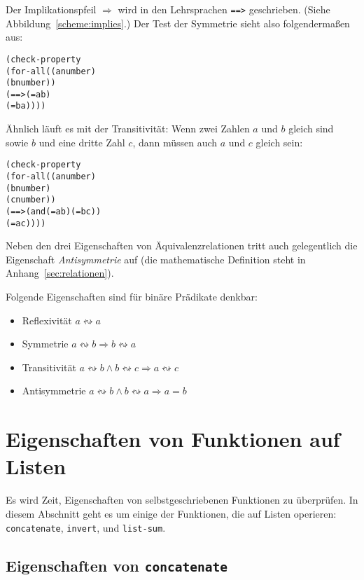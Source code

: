 Der Implikationspfeil $\Rightarrow$ wird in den Lehrsprachen
\texttt{==>} geschrieben.  (Siehe
Abbildung~\ref{scheme:implies}.)  Der Test der
Symmetrie sieht also folgendermaßen aus:
%
\begin{alltt}
(check-property
 (for-all ((a number)
           (b number))
   (==> (= a b)
        (= b a))))
\end{alltt}
%
Ähnlich läuft es mit der Transitivität: Wenn zwei Zahlen $a$ und $b$
gleich sind sowie $b$ und eine dritte Zahl $c$, dann müssen auch $a$
und $c$ gleich sein:
%
\begin{alltt}
(check-property
 (for-all ((a number)
           (b number)
           (c number))
   (==> (and (= a b) (= b c))
        (= a c))))
\end{alltt}
%
Neben den drei Eigenschaften von Äquivalenzrelationen tritt auch
gelegentlich die Eigenschaft
\textit{Antisymmetrie} auf (die mathematische
Definition steht in Anhang~\ref{sec:relationen}).

\begin{mantra}
%
Folgende Eigenschaften sind für binäre Prädikate denkbar:
\begin{itemize}
\item Reflexivität $a \leftrightsquigarrow a$
\item Symmetrie $a \leftrightsquigarrow b \Rightarrow b \leftrightsquigarrow a$
\item Transitivität $a \leftrightsquigarrow b \wedge b
  \leftrightsquigarrow c
  \Rightarrow a \leftrightsquigarrow c$
\item Antisymmetrie $a \leftrightsquigarrow b \wedge  b
  \leftrightsquigarrow a \Rightarrow a = b$
\end{itemize}
\end{mantra}

\section{Eigenschaften von Funktionen auf Listen}

Es wird Zeit, Eigenschaften von selbstgeschriebenen Funktionen zu
überprüfen.  In diesem Abschnitt geht es um einige der Funktionen, die
auf Listen operieren: \texttt{concatenate}, \texttt{invert},
und \texttt{list-sum}.

\subsection{Eigenschaften von \texttt{concatenate}}

